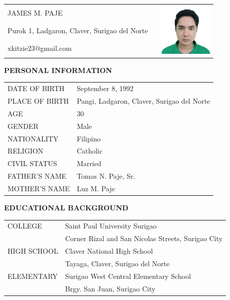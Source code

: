 \documentclass[12pt]{report}
\newcommand{\authorb}{
    James M. Paje %
}
\begin{document}
\begin{spacing}{1.55}
\newpage

\begin{tabularx}{\linewidth}{@{}lXr}
    \MakeUppercase{\authorb} && \multirow{3}{*}{\includegraphics[width=1in]{img/James M.png}} \\
    Purok 1, Ladgaron, Claver, Surigao del Norte && \\
    xkitzie23@gmail.com && \\
\end{tabularx}

\vspace{20pt}

\textbf{PERSONAL INFORMATION}

\vspace{-10pt}
\hrulefill

\begin{tabular}{@{}l@{ : }l}
    DATE OF BIRTH & September 8, 1992 \\
    PLACE OF BIRTH & Pangi, Ladgaron, Claver, Surigao del Norte \\
    AGE & 30\\
    GENDER & Male \\
    NATIONALITY & Filipino \\
    RELIGION & Catholic\\
    CIVIL STATUS & Married \\
    FATHER'S NAME & Tomas N. Paje, Sr. \\
    MOTHER'S NAME & Luz M. Paje\\
\end{tabular}

\vspace{20pt}

\textbf{EDUCATIONAL BACKGROUND}

\vspace{-10pt}
\hrulefill

\begin{tabular}{@{}l@{ : }l}
    COLLEGE & Saint Paul University Surigao \\
    & Corner Rizal and San Nicolas Streets, Surigao City \\
    HIGH SCHOOL & Claver National High School \\
    & Tayaga, Claver, Surigao del Norte \\
    ELEMENTARY & Surigao West Central Elementary School \\
    & Brgy. San Juan, Surigao City \\
\end{tabular}


\end{spacing}
\end{document}
